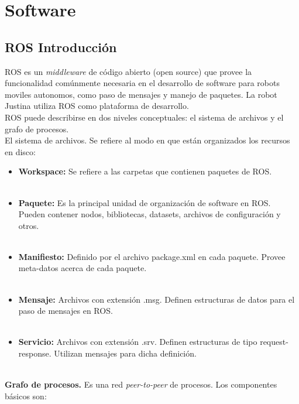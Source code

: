 \documentclass[user_manual.tex]{subfiles}
\begin{document}
 
 \chapter{Software}
\section{ROS Introducción}
ROS es un \textit{middleware} de código abierto (open source) que provee la funcionalidad comúnmente necesaria en el 
desarrollo de software para robots moviles autonomos, como paso de mensajes y manejo de paquetes. La robot Justina 
utiliza ROS como plataforma de desarrollo.\\

ROS puede describirse en dos niveles conceptuales: el sistema de archivos y el grafo de
procesos.\\

El sistema de archivos. Se refiere al modo en que están organizados los recursos en
disco:\\

\begin{itemize}
\item \textbf{Workspace:} Se refiere a las carpetas que contienen paquetes de ROS.\\
\\
\item \textbf{Paquete:} Es la principal unidad de organización de software en ROS. Pueden contener nodos, bibliotecas, datasets,
archivos de configuración y otros.\\
\\
\item \textbf{Manifiesto:} Definido por el archivo package.xml en cada paquete. Provee meta-datos acerca de cada paquete.\\
\\
\item \textbf{Mensaje:} Archivos con extensión .msg. Definen estructuras de datos para el paso de mensajes en ROS.\\
\\
\item \textbf{Servicio:} Archivos con extensión .srv. Definen estructuras de tipo request-response. Utilizan mensajes para dicha definición.\\
\\
\end{itemize}
\textbf{Grafo de procesos.} Es una red \textit{peer-to-peer} de procesos. Los componentes básicos son:\\
\end{document}
